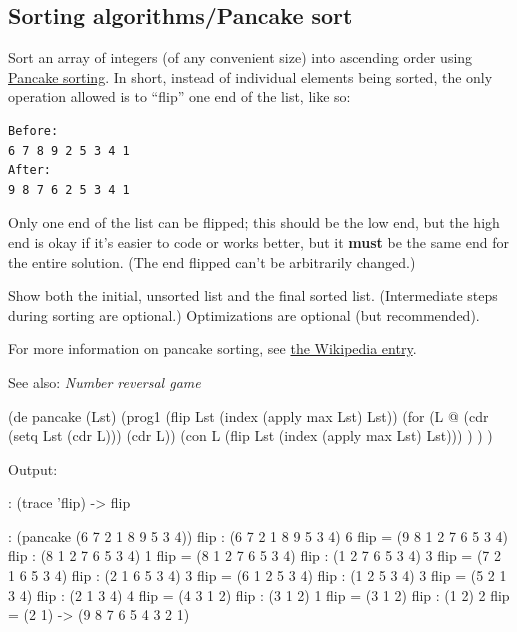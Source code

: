 \begin{itemize}






\pagebreak{}
\section*{Sorting algorithms/Pancake sort}

Sort an array of integers (of any convenient size) into ascending order
using \href{http://en.wikipedia.org/wiki/Pancake\_sorting}{Pancake
sorting}. In short, instead of individual elements being sorted, the
only operation allowed is to ``flip'' one end of the list, like so:

\begin{verbatim}
Before:
6 7 8 9 2 5 3 4 1
After:
9 8 7 6 2 5 3 4 1
\end{verbatim}

Only one end of the list can be flipped; this should be the low end, but
the high end is okay if it's easier to code or works better, but it
\textbf{must} be the same end for the entire solution. (The end flipped
can't be arbitrarily changed.)

Show both the initial, unsorted list and the final sorted list.
(Intermediate steps during sorting are optional.) Optimizations are
optional (but recommended).

For more information on pancake sorting, see
\href{http://en.wikipedia.org/wiki/Pancake\_sorting}{the Wikipedia
entry}.

See also: \emph{Number reversal game}


\begin{wideverbatim}

(de pancake (Lst)
   (prog1 (flip Lst (index (apply max Lst) Lst))
      (for (L @  (cdr (setq Lst (cdr L)))  (cdr L))
         (con L (flip Lst (index (apply max Lst) Lst))) ) ) )

Output:

: (trace 'flip)
-> flip

: (pancake (6 7 2 1 8 9 5 3 4))
 flip : (6 7 2 1 8 9 5 3 4) 6
 flip = (9 8 1 2 7 6 5 3 4)
 flip : (8 1 2 7 6 5 3 4) 1
 flip = (8 1 2 7 6 5 3 4)
 flip : (1 2 7 6 5 3 4) 3
 flip = (7 2 1 6 5 3 4)
 flip : (2 1 6 5 3 4) 3
 flip = (6 1 2 5 3 4)
 flip : (1 2 5 3 4) 3
 flip = (5 2 1 3 4)
 flip : (2 1 3 4) 4
 flip = (4 3 1 2)
 flip : (3 1 2) 1
 flip = (3 1 2)
 flip : (1 2) 2
 flip = (2 1)
-> (9 8 7 6 5 4 3 2 1)


\end{wideverbatim}
\end{itemize}
